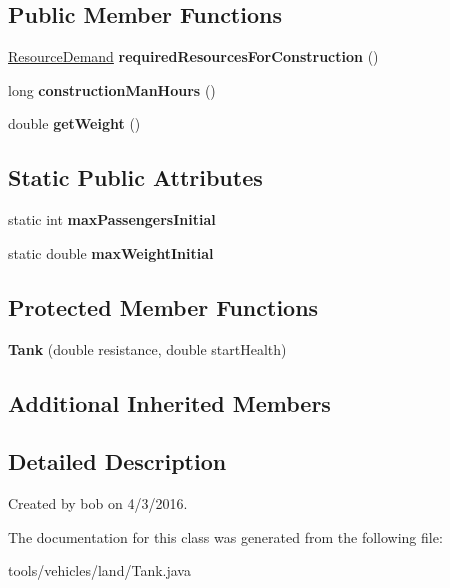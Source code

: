 \subsection*{Public Member Functions}
\begin{DoxyCompactItemize}
\item 
\hyperlink{classuniverse_1_1_resource_demand}{Resource\+Demand} {\bfseries required\+Resources\+For\+Construction} ()\hypertarget{classtools_1_1vehicles_1_1land_1_1_tank_aa08957ae8c4568caf542e6cedde7d7ca}{}\label{classtools_1_1vehicles_1_1land_1_1_tank_aa08957ae8c4568caf542e6cedde7d7ca}

\item 
long {\bfseries construction\+Man\+Hours} ()\hypertarget{classtools_1_1vehicles_1_1land_1_1_tank_a899fa45d2773d6c108fc45ec25dc201b}{}\label{classtools_1_1vehicles_1_1land_1_1_tank_a899fa45d2773d6c108fc45ec25dc201b}

\item 
double {\bfseries get\+Weight} ()\hypertarget{classtools_1_1vehicles_1_1land_1_1_tank_a16fb16b49c442e0e719e7ecdaa9859cc}{}\label{classtools_1_1vehicles_1_1land_1_1_tank_a16fb16b49c442e0e719e7ecdaa9859cc}

\end{DoxyCompactItemize}
\subsection*{Static Public Attributes}
\begin{DoxyCompactItemize}
\item 
static int {\bfseries max\+Passengers\+Initial}\hypertarget{classtools_1_1vehicles_1_1land_1_1_tank_abfec4235077ff28576d6735fb8fbb4b1}{}\label{classtools_1_1vehicles_1_1land_1_1_tank_abfec4235077ff28576d6735fb8fbb4b1}

\item 
static double {\bfseries max\+Weight\+Initial}\hypertarget{classtools_1_1vehicles_1_1land_1_1_tank_a1255e60760a4a59d0f029fb89de93f98}{}\label{classtools_1_1vehicles_1_1land_1_1_tank_a1255e60760a4a59d0f029fb89de93f98}

\end{DoxyCompactItemize}
\subsection*{Protected Member Functions}
\begin{DoxyCompactItemize}
\item 
{\bfseries Tank} (double resistance, double start\+Health)\hypertarget{classtools_1_1vehicles_1_1land_1_1_tank_aa99b59afd550b2a3b64f854c7efd61ac}{}\label{classtools_1_1vehicles_1_1land_1_1_tank_aa99b59afd550b2a3b64f854c7efd61ac}

\end{DoxyCompactItemize}
\subsection*{Additional Inherited Members}


\subsection{Detailed Description}
Created by bob on 4/3/2016. 

The documentation for this class was generated from the following file\+:\begin{DoxyCompactItemize}
\item 
tools/vehicles/land/Tank.\+java\end{DoxyCompactItemize}
